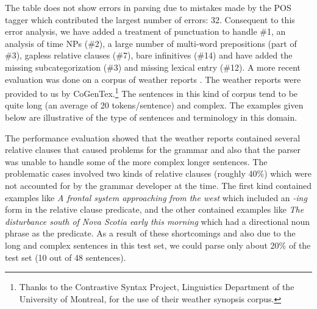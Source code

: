The table does not show errors in parsing due to mistakes made by the POS
tagger which contributed the largest number of errors: 32. Consequent to
this error analysis, we have added a treatment of punctuation to handle
\#1, an analysis of time NPs (\#2), a large number of multi-word
prepositions (part of \#3), gapless relative clauses (\#7), bare
infinitives (\#14) and have added the missing subcategorization (\#3) and
missing lexical entry (\#12).  A more recent evaluation was done on a
corpus of weather reports \cite{c.97:_maint_xtag}. The weather reports were
provided to us by CoGenTex.\footnote{%
%
Thanks to the Contrastive Syntax Project, Linguistics Department of the
University of Montreal, for the use of their weather synopsis corpus.%
%
} The sentences in this kind of corpus tend to be quite long (an average of
20 tokens/sentence) and complex. The examples given below are illustrative
of the type of sentences and terminology in this domain.


The performance evaluation showed that the weather reports contained
several relative clauses that caused problems for the grammar and also that
the parser was unable to handle some of the more complex longer
sentences. The problematic cases involved two kinds of relative clauses
(roughly 40\%) which were not accounted for by the grammar developer at the
time. The first kind contained examples like {\em A frontal system
approaching from the west} which included an {\em -ing} form in the
relative clause predicate, and the other contained examples like {\it The
disturbance south of Nova Scotia early this morning} which had a
directional noun phrase as the predicate. As a result of these shortcomings
and also due to the long and complex sentences in this test set, we could
parse only about 20\% of the test set (10 out of 48 sentences).


